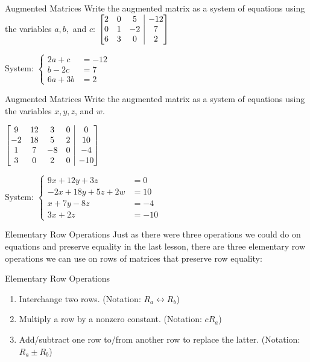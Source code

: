 \documentclass[t, aspectratio=169]{beamer}
\makeatletter
\newenvironment{amatrix}[1]{%
	\left[\begin{array}{@{}*{#1}{c}|c@{}}
	}{%
	\end{array}\right]
}
\makeatother
\begin{document}
	\begin{frame}{Augmented Matrices}
		Write the augmented matrix as a system of equations using the variables $a, b,$ and $c$: $\begin{amatrix}{3}
		2 & 0 & 5 & -12 \\ 0 & 1 & -2 & 7 \\ 6 & 3 & 0 & 2
		\end{amatrix}$ \pause \vspace{24pt}
		
		System: $\begin{cases}
		2a + c &= -12 \\ b - 2c &= 7 \\ 6a + 3b &= 2
		\end{cases}$
	\end{frame}

	\begin{frame}{Augmented Matrices}
		Write the augmented matrix as a system of equations using the variables $x, y, z$, and $w$.
		
		$\begin{amatrix}{4}
		9 & 12 & 3 & 0 & 0 \\ -2 & 18 & 5 & 2 & 10 \\ 1 & 7 & -8 & 0 & -4 \\ 3 & 0 & 2 & 0 & -10
		\end{amatrix}$ \pause \vspace{24pt}
		
		System: $\begin{cases}
		9x + 12y + 3z &= 0 \\ -2x + 18y + 5z + 2w &= 10 \\ x + 7y - 8z &= -4 \\ 3x + 2z &= -10
		\end{cases}$
	\end{frame}
	
	\begin{frame}{Elementary Row Operations}
		Just as there were three operations we could do on equations and preserve equality in the last lesson, there are three elementary row operations we can use on rows of matrices that preserve row equality: \pause
		
		\begin{block}{Elementary Row Operations}
			\begin{enumerate}[1)]
				\item Interchange two rows. (Notation: $R_a \leftrightarrow R_b$)
				\item Multiply a row by a nonzero constant. (Notation: $cR_a$)
				\item Add/subtract one row to/from another row to replace the latter. (Notation: $R_a \pm R_b$)
			\end{enumerate}
		\end{block}
	\end{frame}
\end{document}

